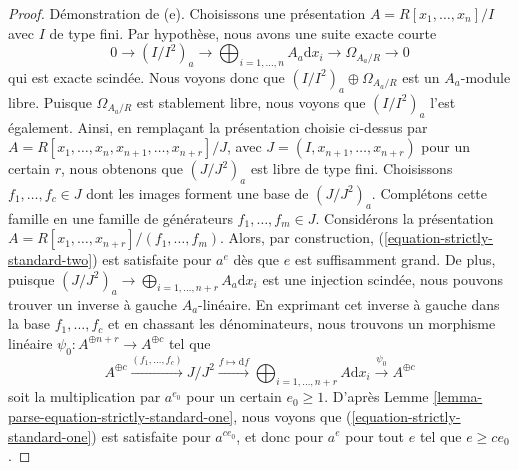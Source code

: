 \begin{proof}
\medskip\noindent
Démonstration de (e). Choisissons une présentation
$A = R[x_1, \ldots, x_n]/I$ avec $I$ de type fini.
Par hypothèse, nous avons une suite exacte courte
$$
0 \to (I/I^2)_a \to \bigoplus\nolimits_{i = 1, \ldots, n} A_a\text{d}x_i \to
\Omega_{A_a/R} \to 0
$$
qui est exacte scindée. Nous voyons donc que
$(I/I^2)_a \oplus \Omega_{A_a/R}$ est un $A_a$-module libre.
Puisque $\Omega_{A_a/R}$ est stablement libre, nous voyons que $(I/I^2)_a$
l'est également. Ainsi, en remplaçant la présentation choisie ci-dessus par
$A = R[x_1, \ldots, x_n, x_{n + 1}, \ldots, x_{n + r}]/J$, avec
$J = (I, x_{n + 1}, \ldots, x_{n + r})$ pour un certain $r$, nous obtenons que
$(J/J^2)_a$ est libre de type fini. Choisissons
$f_1, \ldots, f_c \in J$ dont les images forment une base de $(J/J^2)_a$.
Complétons cette famille en une famille de générateurs
$f_1, \ldots, f_m \in J$. Considérons la présentation
$A = R[x_1, \ldots, x_{n + r}]/(f_1, \ldots, f_m)$.
Alors, par construction, (\ref{equation-strictly-standard-two}) est satisfaite
pour $a^e$ dès que $e$ est suffisamment grand. De plus, puisque
$(J/J^2)_a \to \bigoplus\nolimits_{i = 1, \ldots, n + r} A_a\text{d}x_i$
est une injection scindée, nous pouvons trouver un inverse à gauche
$A_a$-linéaire. En exprimant cet inverse à gauche dans la base
$f_1, \ldots, f_c$ et en chassant les dénominateurs, nous trouvons un morphisme
linéaire
$\psi_0 : A^{\oplus n + r} \to A^{\oplus c}$ tel que
$$
A^{\oplus c} \xrightarrow{(f_1, \ldots, f_c)}
J/J^2 \xrightarrow{f \mapsto \text{d}f}
\bigoplus\nolimits_{i = 1, \ldots, n + r} A \text{d}x_i
\xrightarrow{\psi_0}
A^{\oplus c}
$$
soit la multiplication par $a^{e_0}$ pour un certain $e_0 \geq 1$. D'après
Lemme \ref{lemma-parse-equation-strictly-standard-one},
nous voyons que (\ref{equation-strictly-standard-one}) est satisfaite pour
$a^{ce_0}$, et donc pour $a^e$ pour tout $e$ tel que $e \geq ce_0$.


\end{proof}
